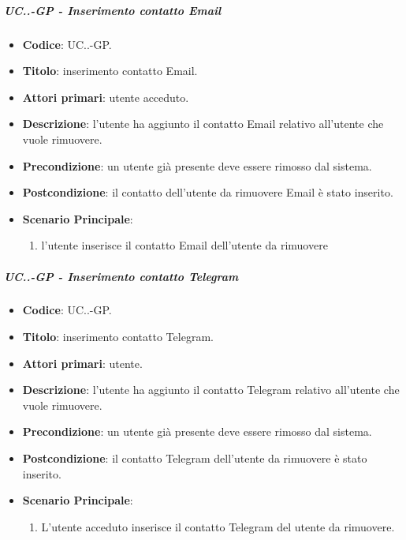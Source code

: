 			\subparagraph{UC\theuccount.\thesubuccount.\thesubsubuccount-GP - Inserimento contatto Email}
				
				\begin{itemize}
					\item \textbf{Codice}: UC\theuccount.\thesubuccount.\thesubsubuccount-GP.
					\item \textbf{Titolo}: inserimento contatto Email.
					\item \textbf{Attori primari}: utente acceduto.
					\item \textbf{Descrizione}: l'utente ha aggiunto il contatto Email relativo all'utente che vuole rimuovere.
					\item \textbf{Precondizione}: un utente già presente deve essere rimosso dal sistema.
					\item \textbf{Postcondizione}: il contatto dell'utente da rimuovere Email è stato inserito.
					\item \textbf{Scenario Principale}:
					\begin{enumerate}
						\item l'utente inserisce il contatto Email dell'utente da rimuovere
					\end{enumerate}
				\end{itemize}
			
			\subparagraph{UC\theuccount.\thesubuccount.\thesubsubuccount-GP - Inserimento contatto Telegram}
				
				\begin{itemize}
					\item \textbf{Codice}: UC\theuccount.\thesubuccount.\thesubsubuccount-GP.
					\item \textbf{Titolo}: inserimento contatto Telegram.
					\item \textbf{Attori primari}: utente.
					\item \textbf{Descrizione}: l'utente ha aggiunto il contatto Telegram relativo all'utente che vuole \newline rimuovere.
					\item \textbf{Precondizione}: un utente già presente deve essere rimosso dal sistema.
					\item \textbf{Postcondizione}: il contatto Telegram dell'utente da rimuovere è stato inserito.
					\item \textbf{Scenario Principale}:
					\begin{enumerate}
						\item L'utente acceduto inserisce il contatto Telegram del utente da rimuovere.
					\end{enumerate}
				\end{itemize}
			
